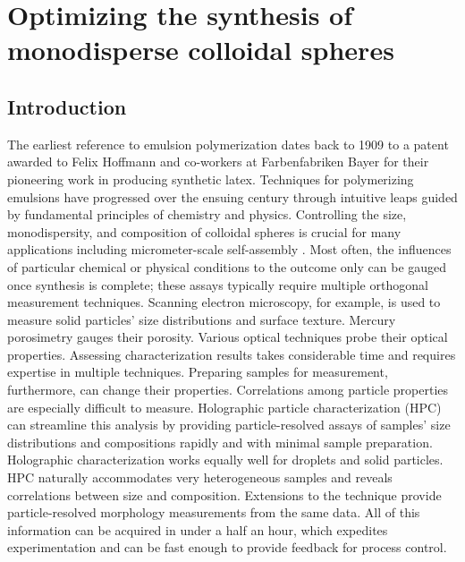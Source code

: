 \chapter{Optimizing the synthesis of monodisperse colloidal spheres}
\label{ch:synthesis}

\section{Introduction}

The earliest reference to emulsion polymerization dates back to
1909 \cite{bayer1909,finch03} to a patent awarded to Felix Hoffmann and
co-workers at Farbenfabriken Bayer for their pioneering work in producing
synthetic latex.
Techniques for polymerizing emulsions have progressed  over the ensuing century
through intuitive leaps guided by fundamental principles of chemistry
and physics.  Controlling the size, monodispersity, and composition of
colloidal spheres is crucial for many applications including micrometer-scale
self-assembly \cite{pusey87,sacanna11}. Most often, the influences of particular chemical
or physical conditions to the outcome only can be gauged once
synthesis is complete; these assays typically require multiple orthogonal measurement
techniques.
Scanning electron microscopy, for example, is used to measure solid particles'
size distributions and surface texture. Mercury porosimetry gauges their
porosity. Various optical techniques probe their optical properties.
Assessing characterization results takes considerable time and requires
expertise in multiple techniques. Preparing samples for measurement,
furthermore, can change their properties. Correlations among particle
properties are especially difficult to measure.
Holographic particle characterization (HPC) can streamline this analysis by providing
particle-resolved assays of samples' size distributions and compositions rapidly and with
minimal sample preparation. Holographic characterization works equally
well for droplets and solid particles. HPC naturally accommodates very heterogeneous
samples and reveals correlations between size and composition. Extensions to the technique
provide particle-resolved morphology measurements from the same data. All of this information
can be acquired in under a half an hour, which expedites experimentation and can be
fast enough to provide feedback for process control.


